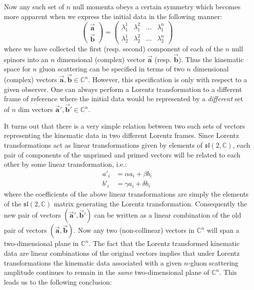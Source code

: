 \documentclass[twocolumn,final,aps,nofootinbib,nobibnotes]{revtex4-2}
\newcommand{\C}{\mathbb{C}}
\newcommand{\bvec}[1]{\boldsymbol{\vec #1}}
\newcommand{\sltwoc}{\mathfrak{sl}(2,\mathbb{C})}
\begin{document}
Now any such set of $ n $ null momenta obeys a certain symmetry which becomes more apparent when we express the initial data in the following manner:
\begin{equation}\label{eqn:n-vectors}
	\begin{pmatrix}
		\bvec{a} \\
		\bvec{b}
	\end{pmatrix} = \begin{pmatrix}
	\lambda^1_1 & \lambda^2_1 & \ldots & \lambda^n_1 \\
	\lambda^1_2 & \lambda^2_2 & \ldots & \lambda^n_2
\end{pmatrix}
\end{equation}
where we have collected the first (resp. second) component of each of the $ n $ null spinors into an $ n $ dimensional (complex) vector $ \bvec{a} $ (resp. $ \bvec{b} $). Thus the kinematic space for $ n $ gluon scattering can be specified in terms of two $ n $ dimensional (complex) vectors $ \bvec{a}, \bvec{b} \in \C^n  $. However, this specification is only with respect to a given observer. One can always perform a Lorentz transformation to a different frame of reference where the initial data would be represented by a \textit{different} set of $ n $ dim vectors $ \bvec{a'}, \bvec{b'} \in \C^n $.

It turns out that there is a very simple relation between two such sets of vectors representing the kinematic data in two different Lorentz frames. Since Lorentz transformations act as linear transformations given by elements of $ \sltwoc $, each pair of components of the unprimed and primed vectors will be related to each other by some linear transformation, i.e.:
\begin{align}\label{eqn:linear-sl2}
		a'_i & = \alpha a_i + \beta b_i \nonumber \\
		b'_i & = \gamma a_i + \delta b_i
\end{align}
where the coefficients of the above linear transformations are simply the elements of the $ \sltwoc $ matrix generating the Lorentz transformation. Consequently the new pair of vectors $ (\bvec{a'}, \bvec{b'}) $ can be written as a linear combination of the old pair of vectors $ (\bvec{a}, \bvec{b}) $. Now any two (non-collinear) vectors in $ \C^n $ will span a two-dimensional plane in $ \C^n $. The fact that the Lorentz transformed kinematic data are linear combinations of the original vectors implies that under Lorentz transformations the kinematic data associated with a given $ n $-gluon scattering amplitude continues to remain in the \textit{same} two-dimensional plane of $ \C^n $. This leads us to the following conclusion:
\end{document}

